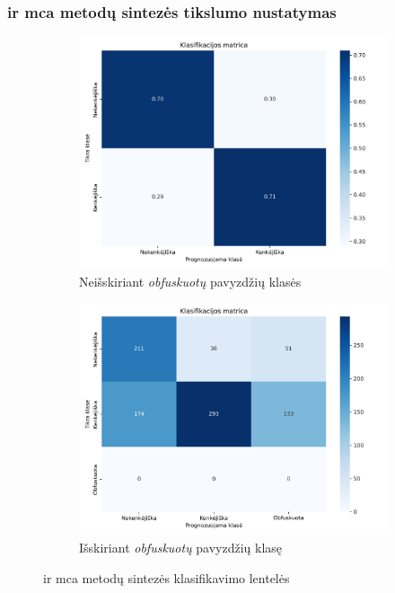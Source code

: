 \subsubsection{\LIME ir \gls{mca} metodų sintezės tikslumo nustatymas}

\TODO

\begin{figure}[h]
    \begin{subfigure}{0.5\textwidth}
        \centering
        \includegraphics[width=\textwidth]{images/synthesis_2x2.png}
        \caption{Neišskiriant \textit{obfuskuotų} pavyzdžių klasės}
    \end{subfigure}
    \begin{subfigure}{0.5\textwidth}
        \centering
        \includegraphics[width=\textwidth]{images/synthesis_3x3.png}
        \caption{Išskiriant \textit{obfuskuotų} pavyzdžių klasę}        
    \end{subfigure}
    \caption{\LIME ir \gls{mca} metodų sintezės klasifikavimo lentelės}
    \label{fig:exp3:confusion}
\end{figure}

